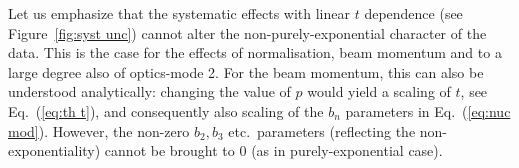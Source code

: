 Let us emphasize that the systematic effects with linear $t$ dependence (see Figure~\ref{fig:syst unc}) cannot alter the non-purely-exponential character of the data. This is the case for the effects of normalisation, beam momentum and to a large degree also of optics-mode 2. For the beam momentum, this can also be understood analytically: changing the value of $p$ would yield a scaling of $t$, see Eq.~(\ref{eq:th t}), and consequently also scaling of the $b_n$ parameters in Eq.~(\ref{eq:nuc mod}). However, the non-zero $b_2, b_3$ etc.~parameters (reflecting the non-exponentiality) cannot be brought to $0$ (as in purely-exponential case).
